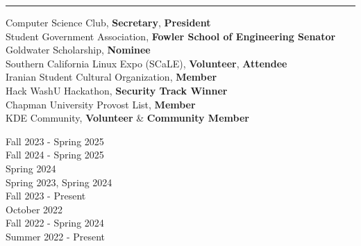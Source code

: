 \documentclass[letter]{article}
\begin{document}
    \medskip
    \vspace{4pt}
    \hrule height 1pt
    \vspace{4pt}
    \noindent
    \begin{minipage}[c]{0.7\linewidth}
        \noindent Computer Science Club, \textbf{Secretary}, \textbf{President} \\
        \noindent Student Government Association, \textbf{Fowler School of Engineering Senator} \\
        \noindent Goldwater Scholarship, \textbf{Nominee} \\
        \noindent Southern California Linux Expo (SCaLE), \textbf{Volunteer}, \textbf{Attendee} \\
        \noindent Iranian Student Cultural Organization, \textbf{Member} \\
        \noindent Hack WashU Hackathon, \textbf{Security Track Winner} \\
        \noindent Chapman University Provost List, \textbf{Member} \\
        \noindent KDE Community, \textbf{Volunteer} \& \textbf{Community Member} \\
    \end{minipage}
    \begin{minipage}[c]{0.295\linewidth}
        \vspace*{-\baselineskip}
        \begin{flushright}
            \noindent Fall 2023 - Spring 2025 \\
            \noindent Fall 2024 - Spring 2025 \\
            \noindent Spring 2024 \\
            \noindent Spring 2023, Spring 2024 \\
            \noindent Fall 2023 - Present \\
            \noindent October 2022 \\
            \noindent Fall 2022 - Spring 2024 \\
            \noindent Summer 2022 - Present \\
        \end{flushright}
    \end{minipage}
\end{document}
